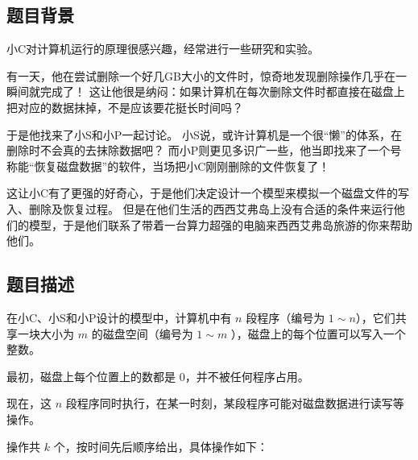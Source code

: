 \subsection*{题目背景}

小C对计算机运行的原理很感兴趣，经常进行一些研究和实验。

有一天，他在尝试删除一个好几GB大小的文件时，惊奇地发现删除操作几乎在一瞬间就完成了！
这让他很是纳闷：如果计算机在每次删除文件时都直接在磁盘上把对应的数据抹掉，不是应该要花挺长时间吗？

于是他找来了小S和小P一起讨论。
小S说，或许计算机是一个很“懒”的体系，在删除时不会真的去抹除数据吧？
而小P则更见多识广一些，他当即找来了一个号称能“恢复磁盘数据”的软件，当场把小C刚刚删除的文件恢复了！

这让小C有了更强的好奇心，于是他们决定设计一个模型来模拟一个磁盘文件的写入、删除及恢复过程。
但是在他们生活的西西艾弗岛上没有合适的条件来运行他们的模型，于是他们联系了带着一台算力超强的电脑来西西艾弗岛旅游的你来帮助他们。

\subsection*{题目描述}

在小C、小S和小P设计的模型中，计算机中有 $n$ 段程序（编号为 $1\sim n$），它们共享一块大小为 $m$ 的磁盘空间（编号为 $1\sim m$ ），磁盘上的每个位置可以写入一个整数。

最初，磁盘上每个位置上的数都是 $0$，并不被任何程序占用。

现在，这 $n$ 段程序同时执行，在某一时刻，某段程序可能对磁盘数据进行读写等操作。

操作共 $k$ 个，按时间先后顺序给出，具体操作如下：

